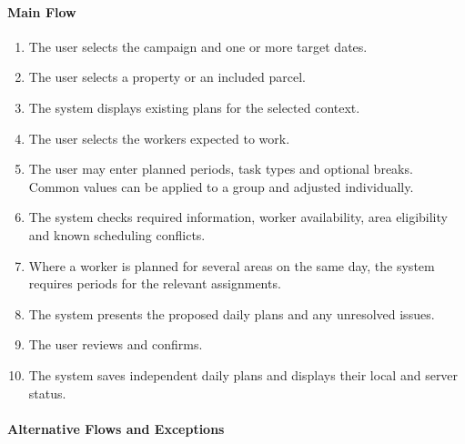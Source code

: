 \paragraph{Main Flow}

\begin{enumerate}
    \item The user selects the campaign
    and one or more target dates.
    \item The user selects a property
    or an included parcel.
    \item The system displays existing plans
    for the selected context.
    \item The user selects the workers
    expected to work.
    \item The user may enter planned periods,
    task types and optional breaks.
    Common values can be applied to a group
    and adjusted individually.
    \item The system checks required information,
    worker availability, area eligibility
    and known scheduling conflicts.
    \item Where a worker is planned
    for several areas on the same day,
    the system requires periods
    for the relevant assignments.
    \item The system presents the proposed
    daily plans and any unresolved issues.
    \item The user reviews and confirms.
    \item The system saves independent daily plans
    and displays their local and server status.
\end{enumerate}

\paragraph{Alternative Flows and Exceptions}

